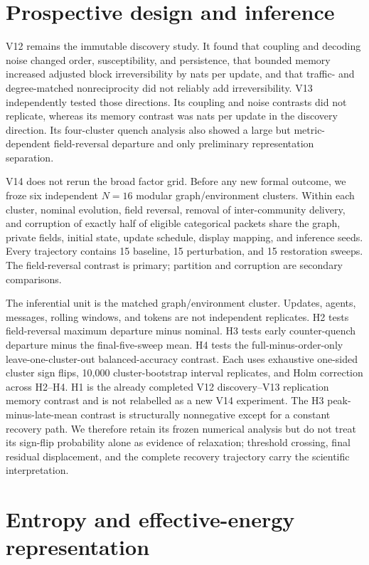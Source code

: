 \documentclass[12pt]{article}
\begin{document}
\section{Prospective design and inference}

V12 remains the immutable discovery study. It found that coupling and decoding
noise changed order, susceptibility, and persistence, that bounded memory
increased adjusted block irreversibility by \VTwelveMemory{} nats per update,
and that traffic- and degree-matched nonreciprocity did not reliably add
irreversibility. V13 independently tested those directions. Its coupling and
noise contrasts did not replicate, whereas its memory contrast was
\VThirteenMemory{} nats per update in the discovery direction. Its four-cluster
quench analysis also showed a large but metric-dependent field-reversal
departure and only preliminary representation separation.

V14 does not rerun the broad factor grid. Before any new formal outcome, we
froze six independent $N=16$ modular graph/environment clusters. Within each
cluster, nominal evolution, field reversal, removal of inter-community
delivery, and corruption of exactly half of eligible categorical packets share
the graph, private fields, initial state, update schedule, display mapping, and
inference seeds. Every trajectory contains 15 baseline, 15 perturbation, and 15
restoration sweeps. The field-reversal contrast is primary; partition and
corruption are secondary comparisons.

The inferential unit is the matched graph/environment cluster. Updates, agents,
messages, rolling windows, and tokens are not independent replicates. H2 tests
field-reversal maximum departure minus nominal. H3 tests early counter-quench
departure minus the final-five-sweep mean. H4 tests the full-minus-order-only
leave-one-cluster-out balanced-accuracy contrast. Each uses exhaustive
one-sided cluster sign flips, 10,000 cluster-bootstrap interval replicates, and
Holm correction across H2--H4. H1 is the already completed V12 discovery--V13
replication memory contrast and is not relabelled as a new V14 experiment.
The H3 peak-minus-late-mean contrast is structurally nonnegative except for a
constant recovery path. We therefore retain its frozen numerical analysis but
do not treat its sign-flip probability alone as evidence of relaxation;
threshold crossing, final residual displacement, and the complete recovery
trajectory carry the scientific interpretation.

\section{Entropy and effective-energy representation}
\end{document}

